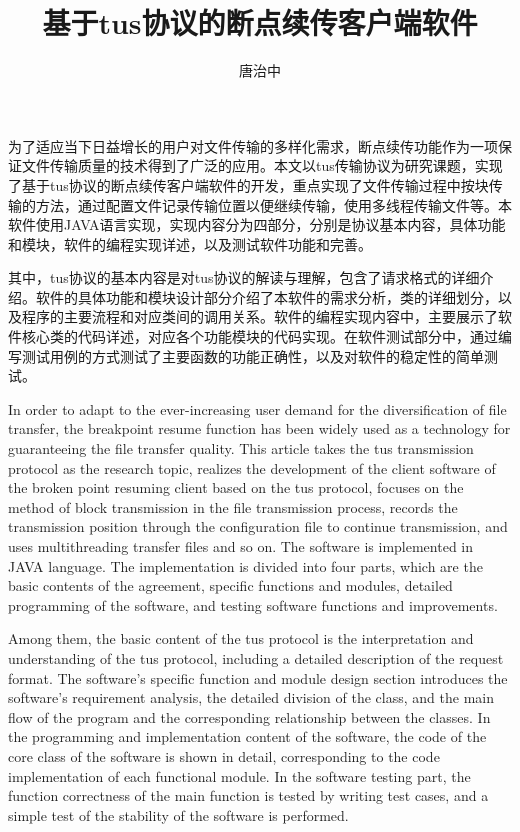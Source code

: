 \documentclass[bachelor]{thesis-uestc}
\title{基于tus协议的断点续传客户端软件}
\author{唐治中}
\begin{document}
\makecover

\begin{chineseabstract}
为了适应当下日益增长的用户对文件传输的多样化需求，断点续传功能作为一项保证文件传输质量的技术得到了广泛的应用。本文以tus传输协议为研究课题，实现了基于tus协议的断点续传客户端软件的开发，重点实现了文件传输过程中按块传输的方法，通过配置文件记录传输位置以便继续传输，使用多线程传输文件等。本软件使用JAVA语言实现，实现内容分为四部分，分别是协议基本内容，具体功能和模块，软件的编程实现详述，以及测试软件功能和完善。
\par 其中，tus协议的基本内容是对tus协议的解读与理解，包含了请求格式的详细介绍。软件的具体功能和模块设计部分介绍了本软件的需求分析，类的详细划分，以及程序的主要流程和对应类间的调用关系。软件的编程实现内容中，主要展示了软件核心类的代码详述，对应各个功能模块的代码实现。在软件测试部分中，通过编写测试用例的方式测试了主要函数的功能正确性，以及对软件的稳定性的简单测试。



\end{chineseabstract}

\begin{englishabstract}
In order to adapt to the ever-increasing user demand for the diversification of file transfer, the breakpoint resume function has been widely used as a technology for guaranteeing the file transfer quality. This article takes the tus transmission protocol as the research topic, realizes the development of the client software of the broken point resuming client based on the tus protocol, focuses on the method of block transmission in the file transmission process, records the transmission position through the configuration file to continue transmission, and uses multithreading transfer files and so on. The software is implemented in JAVA language. The implementation is divided into four parts, which are the basic contents of the agreement, specific functions and modules, detailed programming of the software, and testing software functions and improvements.
\par Among them, the basic content of the tus protocol is the interpretation and understanding of the tus protocol, including a detailed description of the request format. The software's specific function and module design section introduces the software's requirement analysis, the detailed division of the class, and the main flow of the program and the corresponding relationship between the classes. In the programming and implementation content of the software, the code of the core class of the software is shown in detail, corresponding to the code implementation of each functional module. In the software testing part, the function correctness of the main function is tested by writing test cases, and a simple test of the stability of the software is performed.

\end{englishabstract}
\end{document}
